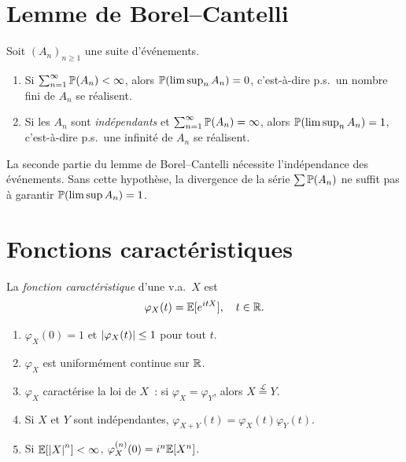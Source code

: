 \section{Lemme de Borel--Cantelli}

\begin{theoreme}
\label{thm:borel_cantelli}
Soit $(A_n)_{n \geq 1}$ une suite d'\'ev\'enements.
\begin{enumerate}
  \item Si $\sum_{n=1}^{\infty} \mathbb{P}(A_n) < \infty$, alors
    $\mathbb{P}(\limsup_{n} A_n) = 0$, c'est-\`a-dire p.s.\ un nombre fini de $A_n$
    se r\'ealisent.
  \item Si les $A_n$ sont \emph{ind\'ependants} et $\sum_{n=1}^{\infty} \mathbb{P}(A_n) = \infty$,
    alors $\mathbb{P}(\limsup_{n} A_n) = 1$, c'est-\`a-dire p.s.\ une infinit\'e de $A_n$
    se r\'ealisent.
\end{enumerate}
\end{theoreme}

\begin{attention}[title=\textbf{Hypoth\`ese d'ind\'ependance}]
La seconde partie du lemme de Borel--Cantelli n\'ecessite l'ind\'ependance des
\'ev\'enements. Sans cette hypoth\`ese, la divergence de la s\'erie $\sum \mathbb{P}(A_n)$
ne suffit pas \`a garantir $\mathbb{P}(\limsup A_n) = 1$.
\end{attention}

\section{Fonctions caract\'eristiques}

\begin{definition}
La \emph{fonction caract\'eristique} d'une v.a.\ $X$ est
\[
  \varphi_X(t) = \mathbb{E}[e^{itX}], \quad t \in \mathbb{R}.
\]
\end{definition}

\begin{proposition}[Propri\'et\'es]
\begin{enumerate}
  \item $\varphi_X(0) = 1$ et $\left| \varphi_X(t) \right| \leq 1$ pour tout $t$.
  \item $\varphi_X$ est uniform\'ement continue sur $\mathbb{R}$.
  \item $\varphi_X$ caract\'erise la loi de $X$~: si $\varphi_X = \varphi_Y$,
    alors $X \overset{\mathcal{L}}{=} Y$.
  \item Si $X$ et $Y$ sont ind\'ependantes, $\varphi_{X+Y}(t) = \varphi_X(t) \varphi_Y(t)$.
  \item Si $\mathbb{E}[\left| X \right|^n] < \infty$, $\varphi_X^{(n)}(0) = i^n \mathbb{E}[X^n]$.
\end{enumerate}
\end{proposition}

